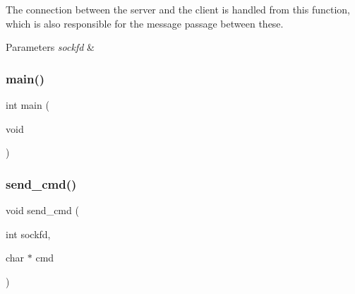 The connection between the server and the client is handled from this function, which is also responsible for the message passage between these. 


\begin{DoxyParams}{Parameters}
{\em sockfd} & \\
\hline
\end{DoxyParams}
\mbox{\label{client_8c_ae66f6b31b5ad750f1fe042a706a4e3d4}} 
\subsubsection{main()}
{\footnotesize\ttfamily int main (\begin{DoxyParamCaption}\item[{void}]{ }\end{DoxyParamCaption})}

\mbox{\label{client_8c_a4117102389756aee8467678b28f484ed}} 
\subsubsection{send\+\_\+cmd()}
{\footnotesize\ttfamily void send\+\_\+cmd (\begin{DoxyParamCaption}\item[{int}]{sockfd,  }\item[{char $\ast$}]{cmd }\end{DoxyParamCaption})}

